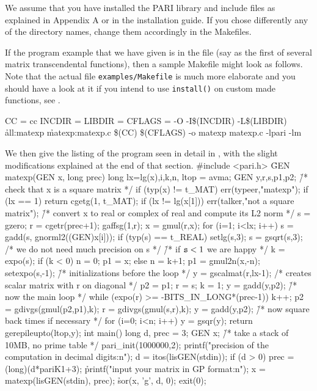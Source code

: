 
We assume that you have installed the PARI library and include files as
explained in Appendix A or in the installation guide. If you chose
differently any of the directory names, change them accordingly in the
Makefiles.

If the program example that we have given is in the file  (say
as the first of several matrix transcendental functions), then a sample
Makefile might look as follows. Note that the actual file
{\tt examples/Makefile} is much more elaborate and you should have a look at
it if you intend to use {\tt install()} on custom made functions, see
.

\bprog
CC = cc
INCDIR = 
LIBDIR = \libdir
CFLAGS = -O -I\$(INCDIR) -L\$(LIBDIR)
\h
all:\qquad matexp
\h
matexp:\qquad	matexp.c
      \$(CC) \$(CFLAGS) -o matexp matexp.c -lpari -lm
\eprog

\noindent We then give the listing of the program 
seen in detail in , with the slight modifications explained
at the end of that section.
%
\bprog
\#include <pari.h>
\h
GEN
matexp(GEN x, long prec)
\obr
   long lx=lg(x),i,k,n, ltop = avma;
   GEN y,r,s,p1,p2;
\h
  /* {\rm check that x is a square matrix} */
  if (typ(x) != t\_MAT) err(typeer,"matexp");
  if (lx == 1) return cgetg(1, t\_MAT);
  if (lx != lg(x[1])) err(talker,"not a square matrix");
\h
  /* {\rm convert x to real or complex of real and compute its L2 norm} */
  s = gzero; r = cgetr(prec+1); gaffsg(1,r); x = gmul(r,x);
  for (i=1; i<lx; i++)
    s = gadd(s, gnorml2((GEN)x[i]));
  if (typ(s) == t\_REAL) setlg(s,3);
  s = gsqrt(s,3); /* {\rm we do not need much precision on s} */
\h
  /* {\rm if ${\tt s}<1$ we are happy} */
  k = expo(s);
  if (k < 0) \obr n = 0; p1 = x; \cbr
  else \obr n = k+1; p1 = gmul2n(x,-n); setexpo(s,-1); \cbr
\h
  /* {\rm initializations before the loop} */
  y = gscalmat(r,lx-1); /* {\rm creates scalar matrix with r on diagonal} */
  p2 = p1; r = s; k = 1;
  y = gadd(y,p2);
\h
  /* {\rm now the main loop} */
  while (expo(r) >= -BITS\_IN\_LONG*(prec-1))
  \obr
    k++; p2 = gdivgs(gmul(p2,p1),k);
    r = gdivgs(gmul(s,r),k); y = gadd(y,p2);
  \cbr
\h
  /* {\rm now square back  times if necessary} */
  for (i=0; i<n; i++) y = gsqr(y);
  return gerepileupto(ltop,y);
\cbr
\h
int
main()
\obr
  long d, prec = 3;
  GEN x;
\h
  /* {\rm take a stack of 10MB, no prime table} */
  pari\_init(1000000,2);
  printf("precision of the computation in decimal digits:\bs n");
  d = itos(lisGEN(stdin));
  if (d > 0) prec = (long)(d*pariK1+3);
\h
  printf("input your matrix in GP format:\bs n");
  x = matexp(lisGEN(stdin), prec);
\h
  sor(x, 'g', d, 0);
  exit(0);
\cbr
\eprog\vfill\eject

